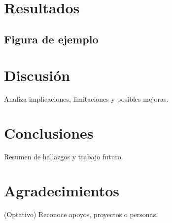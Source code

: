 \documentclass[conference]{IEEEtran} %
\begin{document}
\section{Resultados}
\subsection{Figura de ejemplo}



\section{Discusión}
Analiza implicaciones, limitaciones y posibles mejoras.

\section{Conclusiones}
Resumen de hallazgos y trabajo futuro.

\section*{Agradecimientos}
(Optativo) Reconoce apoyos, proyectos o personas.
\end{document}
